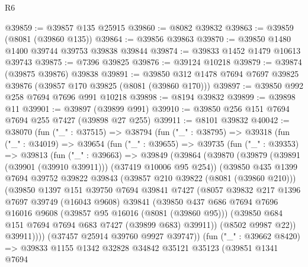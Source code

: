 \begin{lexlean}{R6}
\begin{coremodule}
@39859 := @39857 @135 @25915
@39860 := @8082 @39832
@39863 := @39859 (@8081 (@39860 @135))
@39864 := @39856 @39863
@39870 := @39850 @1480 @1400 @39744 @39753 @39838 @39844
@39874 := @39833 @1452 @1479 @10613 @39743
@39875 := @7396 @39825
@39876 := @39124 @10218
@39879 := @39874 (@39875 @39876) @39838
@39891 := @39850 @312 @1478 @7694 @7697 @39825 @39876 (@39857 @170 @39825 (@8081 (@39860 @170)))
@39897 := @39850 @992 @258 @7694 @7696 @991 @10218
@39898 := @8194 @39832
@39899 := @39898 @11
@39901 := @39897 (@39899 @991)
@39910 := @39850 @256 @151 @7694 @7694 @255 @7427 (@39898 @27 @255)
@39911 := @8101 @39832
@40042 := @38070
    (fun ("_" : @37515) =>
    @38794
      (fun ("_" : @38795) =>
      @39318
        (fun ("_" : @34019) =>
        @39654
          (fun ("_" : @39655) =>
          @39735
            (fun ("_" : @39353) =>
            @39813
              (fun ("_" : @39663) =>
              @39849
                (@39864
                  (@39870
                    (@39879 (@39891 (@39901 (@39910 @39911))) (@37419 @10006 @95 @254))
                    (@39850
                      @435
                      @1399
                      @7694
                      @39752
                      @39822
                      @39843
                      (@39857 @210 @39822 (@8081 (@39860 @210)))
                      (@39850
                        @1397
                        @151
                        @39750
                        @7694
                        @39841
                        @7427
                        (@8057
                          @39832
                          @217
                          @1396
                          @7697
                          @39749
                          (@16043 @9608)
                          @39841
                          (@39850
                            @437
                            @686
                            @7694
                            @7696
                            @16016
                            @9608
                            (@39857 @95 @16016 (@8081 (@39860 @95)))
                            (@39850 @684 @151 @7694 @7694 @683 @7427 (@39899 @683) @39911))
                          (@8502 @9987 @22))
                        @39911))))
                (@37457 @25914 @39760 @9927 @39747))
              (fun ("_" : @39662 @8420) =>
              @39833
                @1155
                @1342
                @32828
                @34842
                @35121
                @35123
                (@39851
                  @1341
                  @7694

\end{coremodule}
\end{lexlean}
